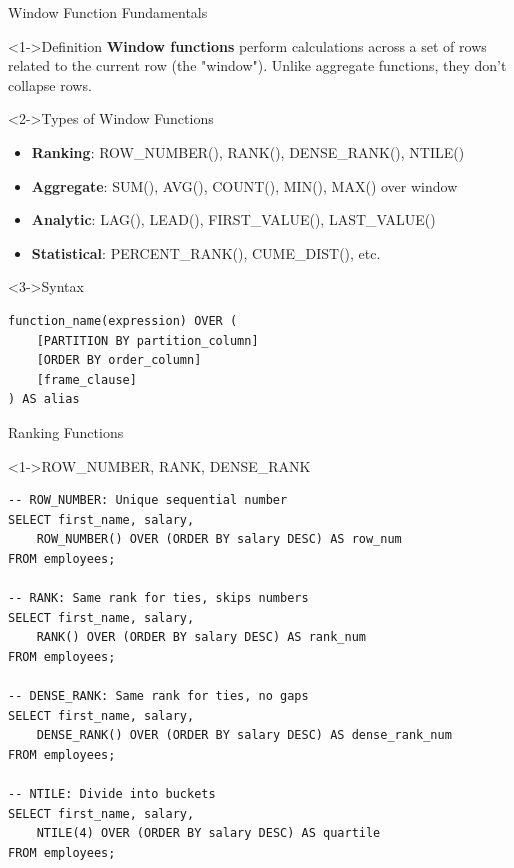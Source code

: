 \documentclass[aspectratio=169,11pt]{beamer}
\begin{document}
\begin{frame}{Window Function Fundamentals}
\begin{block}<1->{Definition}
\textbf{Window functions} perform calculations across a set of rows related to the current row (the "window"). Unlike aggregate functions, they don't collapse rows.
\end{block}

\pause
\begin{block}<2->{Types of Window Functions}
\begin{itemize}
    \item \textbf{Ranking}: ROW_NUMBER(), RANK(), DENSE_RANK(), NTILE()
    \item \textbf{Aggregate}: SUM(), AVG(), COUNT(), MIN(), MAX() over window
    \item \textbf{Analytic}: LAG(), LEAD(), FIRST_VALUE(), LAST_VALUE()
    \item \textbf{Statistical}: PERCENT_RANK(), CUME_DIST(), etc.
\end{itemize}
\end{block}

\pause
\begin{block}<3->{Syntax}
\begin{lstlisting}
function_name(expression) OVER (
    [PARTITION BY partition_column]
    [ORDER BY order_column]
    [frame_clause]
) AS alias
\end{lstlisting}
\end{block}
\end{frame}

\begin{frame}[fragile]{Ranking Functions}
\begin{exampleblock}<1->{ROW_NUMBER, RANK, DENSE_RANK}
\begin{lstlisting}
-- ROW_NUMBER: Unique sequential number
SELECT first_name, salary,
    ROW_NUMBER() OVER (ORDER BY salary DESC) AS row_num
FROM employees;

-- RANK: Same rank for ties, skips numbers
SELECT first_name, salary,
    RANK() OVER (ORDER BY salary DESC) AS rank_num
FROM employees;

-- DENSE_RANK: Same rank for ties, no gaps
SELECT first_name, salary,
    DENSE_RANK() OVER (ORDER BY salary DESC) AS dense_rank_num
FROM employees;

-- NTILE: Divide into buckets
SELECT first_name, salary,
    NTILE(4) OVER (ORDER BY salary DESC) AS quartile
FROM employees;
\end{lstlisting}
\end{exampleblock}
\end{frame}
\end{document}
